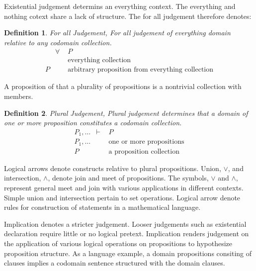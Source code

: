 \documentclass[aps,twocolumn,secnumarabic,nobalancelastpage,amsmath,amssymb,
amsthm,nofootinbib,parskip=full]{revtex4}
\numberwithin{equation}{section}
\newtheorem{definition}{Definition}[section]
\begin{document}
Existential judgement determins an everything context.
The everything and nothing cotext share a lack of structure.
The for all judgement therefore denotes:


\begin{definition}{For all Judgement}\label{def:foralljudgement},
  For all judgement of everything domain relative to any codomain collection.
  \begin{equation*}
  \begin{array}{rll}
   &\forall& P \\[3pt]
   &\quad&\text{everything collection} \\[3pt]
   P&\quad&\text{arbitrary proposition from everything collection}
  \end{array}
  \end{equation*}
\end{definition}

A proposition of that a plurality of propositions is a nontrivial collection
with members.

\begin{definition}{Plural Judgement}\label{def:pluraljudgement},
  Plural judgement determines that a domain of one or more proposition
  constitutes a codomain collection.
  \begin{equation*}
  \begin{array}{rll}
   P_1,\dots&\vdash& P \\[3pt]
   P_1,\dots&\quad&\text{one or more propositions} \\[3pt]
   P&\quad&\text{a proposition collection}
  \end{array}
  \end{equation*}
\end{definition}

Logical arrows denote constructs relative to plural propositions.
Union, $\vee$, and intersection, $\wedge$, denote join and meet of propositions.
The symbols, $\vee$ and $\wedge$, represent general meet and join
with various applications in different contexts.
Simple union and intersection pertain to set operations.
Logical arrow denote rules for construction of statements in a mathematical
language.

Implication denotes a stricter judgement. Looser judgements such as
existential declaration require little or no logical pretext.
Implication renders judgement on the application of various logical
operations on propositions to hypothesize proposition structure.
As a language example, a domain propositions consiting of clauses implies
a codomain sentence structured with the domain clauses.
\end{document}
